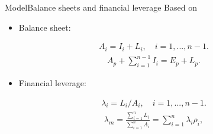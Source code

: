 \documentclass{beamer}
\begin{document}
\begin{frame}{Model}{Balance sheets and financial leverage}
Based on \cite*{huizinga2008capital}
\begin{itemize}
	\item  Balance sheet:
\end{itemize}
\begin{equation}
\begin{aligned}
A_i=I_i+L_i, \quad i=1,...,n-1.
\end{aligned}
\label{eq:sub balance sheet}
\end{equation}
\begin{equation}
\begin{aligned}
A_p+\sum_{i=1}^{n-1}I_i=E_p+L_p. 
\end{aligned}
\label{eq:parent balance sheet}
\end{equation}
\begin{itemize}
	\item  Financial leverage:
\end{itemize}
\begin{equation*}
\begin{aligned}
\lambda_i=L_i/A_i, \quad i=1,...,n-1.
\end{aligned}
\label{eq:sub leverage}
\end{equation*}
\begin{equation}
\begin{aligned}
\lambda_m=\frac{\sum_{i=1}^{n}L_i}{\sum_{i=1}^{n}A_i}=\sum_{i=1}^{n}\lambda_i\rho_i, 
\end{aligned}
\label{eq:total leverage}
\end{equation} 
\end{frame}
\end{document}
